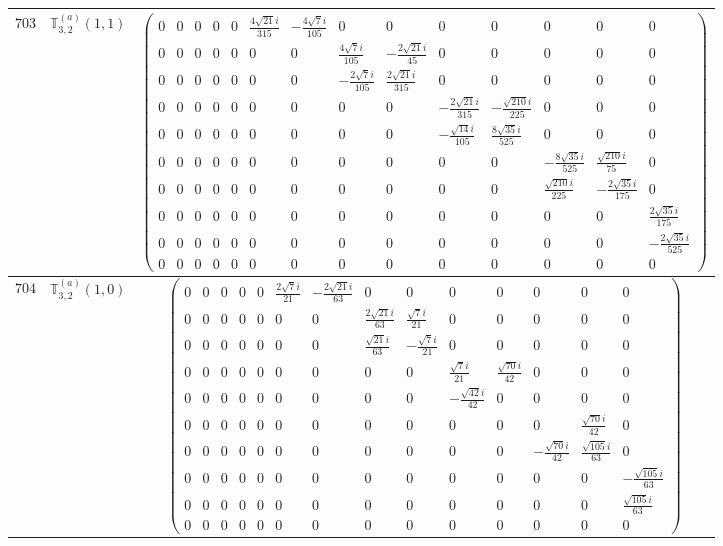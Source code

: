 \documentclass[fleqn,8pt,landscape]{jsarticle}
\begin{document}
\begin{center}
\begin{longtable}{ccc}
$ 703 $ & $ \mathbb{T}_{3,2}^{(a)}(1,1) $ & $ \begin{pmatrix} 0 & 0 & 0 & 0 & 0 & \frac{4 \sqrt{21} i}{315} & - \frac{4 \sqrt{7} i}{105} & 0 & 0 & 0 & 0 & 0 & 0 & 0 \\ 0 & 0 & 0 & 0 & 0 & 0 & 0 & \frac{4 \sqrt{7} i}{105} & - \frac{2 \sqrt{21} i}{45} & 0 & 0 & 0 & 0 & 0 \\ 0 & 0 & 0 & 0 & 0 & 0 & 0 & - \frac{2 \sqrt{7} i}{105} & \frac{2 \sqrt{21} i}{315} & 0 & 0 & 0 & 0 & 0 \\ 0 & 0 & 0 & 0 & 0 & 0 & 0 & 0 & 0 & - \frac{2 \sqrt{21} i}{315} & - \frac{\sqrt{210} i}{225} & 0 & 0 & 0 \\ 0 & 0 & 0 & 0 & 0 & 0 & 0 & 0 & 0 & - \frac{\sqrt{14} i}{105} & \frac{8 \sqrt{35} i}{525} & 0 & 0 & 0 \\ 0 & 0 & 0 & 0 & 0 & 0 & 0 & 0 & 0 & 0 & 0 & - \frac{8 \sqrt{35} i}{525} & \frac{\sqrt{210} i}{75} & 0 \\ 0 & 0 & 0 & 0 & 0 & 0 & 0 & 0 & 0 & 0 & 0 & \frac{\sqrt{210} i}{225} & - \frac{2 \sqrt{35} i}{175} & 0 \\ 0 & 0 & 0 & 0 & 0 & 0 & 0 & 0 & 0 & 0 & 0 & 0 & 0 & \frac{2 \sqrt{35} i}{175} \\ 0 & 0 & 0 & 0 & 0 & 0 & 0 & 0 & 0 & 0 & 0 & 0 & 0 & - \frac{2 \sqrt{35} i}{525} \\ 0 & 0 & 0 & 0 & 0 & 0 & 0 & 0 & 0 & 0 & 0 & 0 & 0 & 0 \end{pmatrix} $ \\ \hline
$ 704 $ & $ \mathbb{T}_{3,2}^{(a)}(1,0) $ & $ \begin{pmatrix} 0 & 0 & 0 & 0 & 0 & \frac{2 \sqrt{7} i}{21} & - \frac{2 \sqrt{21} i}{63} & 0 & 0 & 0 & 0 & 0 & 0 & 0 \\ 0 & 0 & 0 & 0 & 0 & 0 & 0 & \frac{2 \sqrt{21} i}{63} & \frac{\sqrt{7} i}{21} & 0 & 0 & 0 & 0 & 0 \\ 0 & 0 & 0 & 0 & 0 & 0 & 0 & \frac{\sqrt{21} i}{63} & - \frac{\sqrt{7} i}{21} & 0 & 0 & 0 & 0 & 0 \\ 0 & 0 & 0 & 0 & 0 & 0 & 0 & 0 & 0 & \frac{\sqrt{7} i}{21} & \frac{\sqrt{70} i}{42} & 0 & 0 & 0 \\ 0 & 0 & 0 & 0 & 0 & 0 & 0 & 0 & 0 & - \frac{\sqrt{42} i}{42} & 0 & 0 & 0 & 0 \\ 0 & 0 & 0 & 0 & 0 & 0 & 0 & 0 & 0 & 0 & 0 & 0 & \frac{\sqrt{70} i}{42} & 0 \\ 0 & 0 & 0 & 0 & 0 & 0 & 0 & 0 & 0 & 0 & 0 & - \frac{\sqrt{70} i}{42} & \frac{\sqrt{105} i}{63} & 0 \\ 0 & 0 & 0 & 0 & 0 & 0 & 0 & 0 & 0 & 0 & 0 & 0 & 0 & - \frac{\sqrt{105} i}{63} \\ 0 & 0 & 0 & 0 & 0 & 0 & 0 & 0 & 0 & 0 & 0 & 0 & 0 & \frac{\sqrt{105} i}{63} \\ 0 & 0 & 0 & 0 & 0 & 0 & 0 & 0 & 0 & 0 & 0 & 0 & 0 & 0 \end{pmatrix} $ \\ \hline

\end{longtable}
\end{center}
\end{document}
